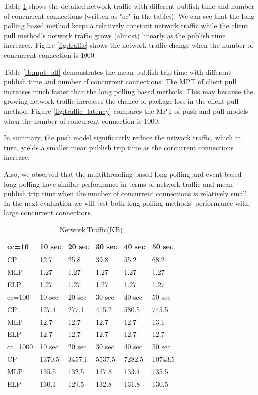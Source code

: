 Table \ref{tb:traffic} shows the detailed network traffic with different 
publish time and number of concurrent connections (written as "cc" 
in the tables).  We can see that the long polling based method keeps 
a relatively constant network traffic while the client pull method's 
network traffic grows (almost) linearly as the publish time increases.
Figure \ref{fig:traffic} shows the network traffic change when the number 
of concurrent connection is $1000$.

Table \ref{tb:mpt_all} demonstrates the mean publish trip time with 
different publish time and number of concurrent connections. The MPT of
client pull increases much faster than the long polling based methods.
This may because the growing network traffic increases the chance
of package loss in the client pull method. 
Figure \ref{fig:traffic_latency} compares the MPT of push and pull models when 
the number of concurrent connection is $1000$.

In summary, the push model significantly reduce the network traffic, which in
turn, yields a smaller mean publish trip time as the concurrent connections 
increase. 

Also, we observed that the multithreading-based long polling and event-based long 
polling have similar performance in terms of network traffic and mean publish
trip time when the number of concurrent connections is relatively small. In the 
next evaluation we will test both long polling methods' performance with large 
concurrent connections.

\begin{table}
\centering \caption{\label{tb:traffic} Network Traffic(KB)}
\begin{tabular}{|l|l|l|l|l|l|}
    \hline cc=10& 10 sec & 20 sec & 30 sec & 40 sec & 50 sec \\
    \hline CP & 12.7 & 25.8 & 39.8 & 55.2 & 68.2 \\
    \hline MLP & 1.27 & 1.27 & 1.27 & 1.27 & 1.27 \\
    \hline ELP & 1.27 & 1.27 & 1.27 & 1.27 & 1.27 \\
    \hline
    \hline cc=100& 10 sec & 20 sec & 30 sec & 40 sec & 50 sec \\
    \hline CP & 127.4 & 277.1 & 415.2 & 580.5 & 745.5 \\
    \hline MLP & 12.7 & 12.7 & 12.7 & 12.7 & 13.1 \\
    \hline ELP & 12.7 & 12.7 & 12.7 & 12.7 & 12.7 \\
    \hline
    \hline cc=1000 & 10 sec & 20 sec & 30 sec & 40 sec & 50 sec \\
    \hline CP & 1370.5 & 3457.1 & 5537.5 & 7282.5 & 10743.5 \\
    \hline MLP & 135.5 & 132.5 & 137.8 & 133.4 & 135.5 \\
    \hline ELP & 130.1 & 129.5 & 132.8 & 131.8 & 130.5 \\
    \hline
\end{tabular}
\end{table}

